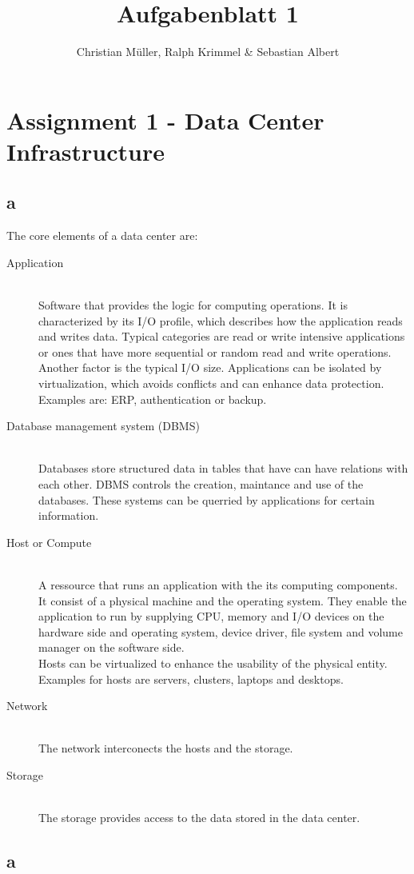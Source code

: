 \documentclass{article}
\begin{document}
\title{Aufgabenblatt 1}
\author{Christian Müller, Ralph Krimmel \& Sebastian Albert }

\maketitle


\section{Assignment 1 - Data Center Infrastructure}

\subsection{a}
	The core elements of a data center are:\\
	\begin{description}
		\item[Application] \hfill \\
			Software that provides the logic for computing operations.
			It is characterized by its I/O profile,
			which describes how the application reads and writes data.
			Typical categories are read or write intensive applications
			or ones that have more sequential or random read and write operations.
			Another factor is the typical I/O size.
			Applications can be isolated by virtualization,
			which avoids conflicts and can enhance data protection.\\
			Examples are: ERP, authentication or backup.

		\item[Database management system (DBMS)] \hfill \\
			Databases store structured data in tables that have can have relations with each other.
			DBMS controls the creation, maintance and use of the databases.
			These systems can be querried by applications for certain information.
			
		\item[Host or Compute] \hfill \\
			A ressource that runs an application with the its computing components.
			It consist of a physical machine and the operating system.
			They enable the application to run by supplying CPU, memory and I/O devices on the hardware side
			and operating system, device driver, file system and volume manager on the software side.\\
			Hosts can be virtualized to enhance the usability of the physical entity.
			Examples for hosts are servers, clusters, laptops and desktops.

		\item[Network] \hfill \\
			The network interconects the hosts and the storage.

		\item[Storage] \hfill \\
			The storage provides access to the data stored in the data center.
	\end{description}




\subsection{a}
\end{document}
